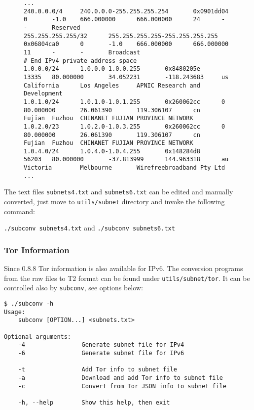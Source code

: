 \begin{figure}[!ht]
\begin{small}
\begin{lstlisting}
...
240.0.0.0/4     240.0.0.0-255.255.255.254       0x0901dd04      0       -1.0    666.000000      666.000000      24      -       -       Reserved
255.255.255.255/32      255.255.255.255-255.255.255.255 0x06804ca0      0       -1.0    666.000000      666.000000      11      -       -       Broadcast
# End IPv4 private address space
1.0.0.0/24      1.0.0.0-1.0.0.255       0x8480205e      13335   80.000000       34.052231       -118.243683     us      California      Los Angeles     APNIC Research and Development
1.0.1.0/24      1.0.1.0-1.0.1.255       0x260062cc      0       80.000000       26.061390       119.306107      cn      Fujian  Fuzhou  CHINANET FUJIAN PROVINCE NETWORK
1.0.2.0/23      1.0.2.0-1.0.3.255       0x260062cc      0       80.000000       26.061390       119.306107      cn      Fujian  Fuzhou  CHINANET FUJIAN PROVINCE NETWORK
1.0.4.0/24      1.0.4.0-1.0.4.255       0x148284d8      56203   80.000000       -37.813999      144.963318      au      Victoria        Melbourne       Wirefreebroadband Pty Ltd
...
\end{lstlisting}
\end{small}
\end{figure}

The text files {\tt subnets4.txt} and {\tt subnets6.txt} can be edited and manually converted,
just move to {\tt utils/subnet} directory and invoke the following command:

\begin{center}
{\tt ./subconv subnets4.txt} and
{\tt ./subconv subnets6.txt}
\end{center}

\subsubsection{Tor Information}

Since 0.8.8 Tor information is also available for IPv6. The conversion programs from the
raw files to T2 format can be found under {\tt utils/subnet/tor}. It can be controlled also
by {\tt subconv}, see options below:

\begin{center}
    \begin{verbatim}
$ ./subconv -h
Usage:
    subconv [OPTION...] <subnets.txt>

Optional arguments:
    -4                Generate subnet file for IPv4
    -6                Generate subnet file for IPv6

    -t                Add Tor info to subnet file
    -a                Download and add Tor info to subnet file
    -c                Convert from Tor JSON info to subnet file

    -h, --help        Show this help, then exit
    \end{verbatim}
\end{center}

